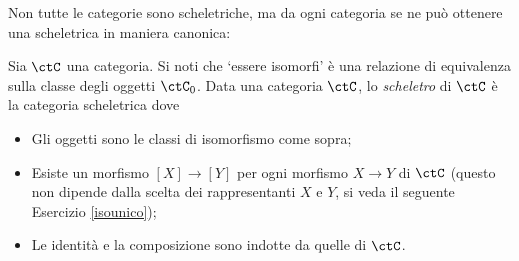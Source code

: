 Non tutte le categorie sono scheletriche, ma da ogni categoria se ne può ottenere una scheletrica in maniera canonica:

\begin{definition}\label{def_scheletro}
	Sia \(\ctC\) una categoria.	Si noti che `essere isomorfi' è una relazione di equivalenza sulla classe degli oggetti \(\ctC_0\).
	Data una categoria \(\ctC\), lo \emph{scheletro} di \(\ctC\) è la categoria scheletrica dove
	\begin{itemize}
		\item Gli oggetti sono le classi di isomorfismo come sopra;
		\item Esiste un morfismo \([X]\to[Y]\) per ogni morfismo \(X\to Y\) di \(\ctC\) (questo non dipende dalla scelta dei rappresentanti \(X\) e \(Y\), si veda il seguente Esercizio \ref{isounico});
		\item Le identità e la composizione sono indotte da quelle di \(\ctC\).
	\end{itemize}
\end{definition}


